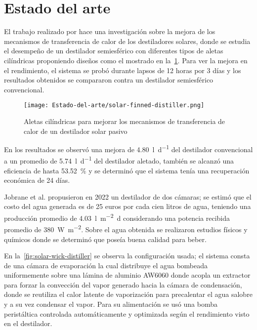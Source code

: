 \section{Estado del arte}
	
	El trabajo realizado por \cite{kabeel_performance_2022} hace una investigación sobre la mejora de los mecanismos de transferencia de calor de los destiladores solares, donde se estudia el desempeño de un destilador semiesférico con diferentes tipos de aletas cilíndricas proponiendo diseños como el mostrado en la~\cref{fig:solar-finned-distiller}. Para ver la mejora en el rendimiento, el sistema se probó durante lapsos de 12 horas por 3 días y los resultados obtenidos se compararon contra un destilador semiesférico convencional. 	
		
	\begin{figure}[H]
		\centering
		\texttt{[image: Estado-del-arte/solar-finned-distiller.png]}
		\caption{Aletas cilíndricas para mejorar los mecanismos de transferencia de calor de un destilador solar pasivo}
		\label{fig:solar-finned-distiller}
	\end{figure}
	
	En los resultados se observó una mejora de \SI{4.80}{\litre\per\day} del destilador convencional a un promedio de \SI{5.74}{\litre\per\day} del destilador aletado, también se alcanzó una eficiencia de hasta \qty{53.52}{\percent} y se determinó que el sistema tenía una recuperación económica de 24 días.
	
	Jobrane et al. \cite{jobrane_theoretical_2022} propusieron en 2022 un destilador de dos cámaras; se estimó que el costo del agua generada es de 25 euros por cada cien litros de agua, teniendo una producción promedio de \SI{4.03}{\litre\per\m\tothe{2}\day} considerando una potencia recibida promedio de \SI{380}{\watt\per\m\tothe{2}}. Sobre el agua obtenida se realizaron estudios físicos y químicos donde se determinó que poseía buena calidad para beber.
	
	En la~\cref{fig:solar-wick-distiller} se observa la configuración usada; el sistema consta de una cámara de evaporación la cual distribuye el agua bombeada uniformemente sobre una lámina de aluminio AW6060 donde acopla un extractor para forzar la convección del vapor generado hacia la cámara de condensación, donde se reutiliza el calor latente de vaporización para precalentar el agua salobre y a su vez condensar el vapor. Para su alimentación se usó una bomba peristáltica controlada automáticamente y optimizada según el rendimiento visto en el destilador.
	
